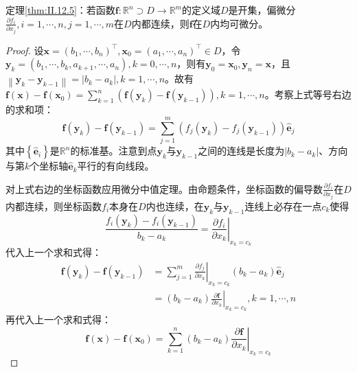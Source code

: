 \documentclass[main.tex]{subfiles}
\begin{document}
\begin{theorem*}[充分条件]
定理\ref{thm:II.12.5}：若函数$\mathbf{f}:\mathbb{R}^n\supset D\rightarrow\mathbb{R}^m$的定义域$D$是开集，偏微分$\frac{\partial f_i}{\partial x_j},i=1,\cdots,n,j=1,\cdots,m$在$D$内都连续，则$\mathbf{f}$在$D$内均可微分。
\end{theorem*}
\begin{proof}
设$\mathbf{x}=\left(b_1,\cdots,b_n\right)^\intercal,\mathbf{x}_0=\left(a_1,\cdots,a_n\right)^\intercal\in D$，令$\mathbf{y}_k=\left(b_1,\cdots,b_k,a_{k+1},\cdots,a_n\right),k=0,\cdots,n$，则有$\mathbf{y}_0=\mathbf{x}_0,\mathbf{y}_n=\mathbf{x}$，且$\left\|\mathbf{y}_k-\mathbf{y}_{k-1}\right\|=\left|b_k-a_k\right|,k=1,\cdots,n$。故有$\mathbf{f}\left(\mathbf{x}\right)-\mathbf{f}\left(\mathbf{x}_0\right)=\sum_{k=1}^n\left(\mathbf{f}\left(\mathbf{y}_k\right)-\mathbf{f}\left(\mathbf{y}_{k-1}\right)\right),k=1,\cdots,n$。考察上式等号右边的求和项：
\[\mathbf{f}\left(\mathbf{y}_k\right)-\mathbf{f}\left(\mathbf{y}_{k-1}\right)=\sum_{j=1}^m\left(f_j\left(\mathbf{y}_k\right)-f_j\left(\mathbf{y}_{k-1}\right)\right)\mathbf{\hat{e}}_j
\]
其中$\left\{\mathbf{\hat{e}}_i\right\}$是$\mathbb{R}^n$的标准基。注意到点$\mathbf{y}_k$与$\mathbf{y}_{k-1}$之间的连线是长度为$\left|b_k-a_k\right|$、方向与第$k$个坐标轴$\mathbf{\hat{e}}_k$平行的有向线段。

对上式右边的坐标函数应用微分中值定理。由命题条件，坐标函数的偏导数$\frac{\partial f_i}{\partial x_j}$在$D$内都连续，则坐标函数$f_i$本身在$D$内也连续，在$\mathbf{y}_k$与$\mathbf{y}_{k-1}$连线上必存在一点$c_k$使得
\[\frac{f_i\left(\mathbf{y}_k\right)-f_i\left(\mathbf{y}_{k-1}\right)}{b_k-a_k}=\left.\frac{\partial f_i}{\partial x_k}\right|_{x_k=c_k}\]
代入上一个求和式得：
\begin{align*}
\mathbf{f}\left(\mathbf{y}_k\right)-\mathbf{f}\left(\mathbf{y}_{k-1}\right)&=\sum_{j=1}^m\left.\frac{\partial f_j}{\partial x_k}\right|_{x_k=c_k}\left(b_k-a_k\right)\mathbf{\hat{e}}_j\\
&=\left(b_k-a_k\right)\left.\frac{\partial \mathbf{f}}{\partial x_k}\right|_{x_k=c_k},k=1,\cdots,n
\end{align*}
再代入上一个求和式得：
\[\mathbf{f}\left(\mathbf{x}\right)-\mathbf{f}\left(\mathbf{x}_0\right)=\sum_{k=1}^n\left(b_k-a_k\right)\left.\frac{\partial \mathbf{f}}{\partial x_k}\right|_{x_k=c_k}
\]


\end{proof}
\end{document}
